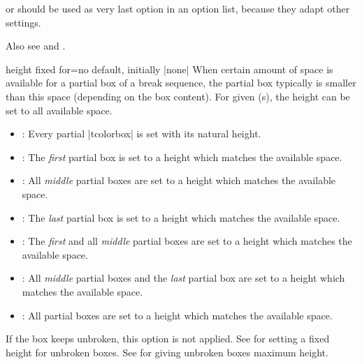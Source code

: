 \begin{dispListing}

\begin{tcolorbox}[enhanced jigsaw,breakable,pad at break*=0mm,
  title={For this box, the pad space at the break point is set to 0mm}]
  \lipsum[1-2]
\end{tcolorbox}
\end{dispListing}
{\tcbusetemp}


\begin{marker}
 or 
should be used as very last option in an option list, because
they adapt other settings.
\end{marker}


\begin{marker}
Also see 
and .
\end{marker}


\begin{docTcbKey}{height fixed for}{=}{no default, initially |none|}
  When certain amount of space is available for a partial box of a
  break sequence, the partial box typically is smaller than this space
  (depending on the box content). For given (s), the height can be
  set to all available space.
  \begin{itemize}
  \item{}: Every partial |tcolorbox| is set with its natural height.
  \item{}: The \emph{first} partial box is set to a height which matches the available space.
  \item{}: All \emph{middle} partial boxes are set to a height which matches the available space.
  \item{}: The \emph{last} partial box is set to a height which matches
    the available space.
  \item{}: The \emph{first} and
    all \emph{middle} partial boxes are set to a height which matches the available space.
  \item{}: All \emph{middle} partial boxes and the \emph{last} partial box
    are set to a height which matches the available space.
  \item{}: All partial boxes are set to a height which matches the available space.
  \end{itemize}
\begin{marker}
  If the box keeps unbroken, this option is not applied.
  See  for setting a fixed height for unbroken boxes.
  See  for giving unbroken boxes maximum height.
\end{marker}
\end{docTcbKey}


